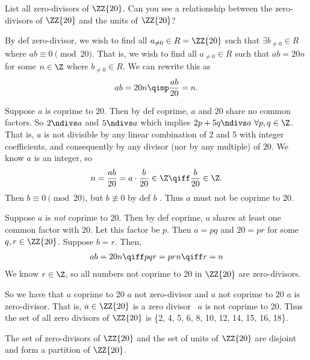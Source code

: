 \documentclass{article}
\begin{document}
List all zero-divisors of \( \ZZ{20} \). Can you see a relationship between the zero-divisors of \( \ZZ{20} \) and the units of \( \ZZ{20} \)?

\begin{solution} %
  By def zero-divisor, we wish to find all \( a_{\neq 0}\in R = \ZZ{20} \) such that \( \exists b_{\neq 0} \in R \) where \( ab\equiv 0 \pmod{20} \).
  That is, we wish to find all \( a_{\neq 0} \in R \) such that \( ab = 20n \) for some \( n\in\Z \) where \( b_{\neq 0}\in R \).
  We can rewrite this as
  \begin{align*}
    ab = 20n \qimp \frac{ab}{20} = n.
  \end{align*}

  Suppose \( a \) is coprime to \( 20 \). Then by def coprime, \( a \) and \( 20 \) share no common factors.
  So \( 2\ndivs a \) and \( 5\ndivs a \) which implies \( 2p+5q\ndivs a\ \forall p,q\in\Z \).
  That is, \( a \) is not divisible by any linear combination of 2 and 5 with integer coefficients, and consequently by any divisor (nor by any multiple) of \( 20 \). We know \( a \) is an integer, so
  \begin{align*}
    n = \frac{ab}{20} = a \cdot \frac{b}{20}\in\Z \qiff \frac{b}{20}\in\Z.
  \end{align*}
  Then \( b \equiv 0\pmod{20} \), but \( b\not\equiv 0 \) by def \( b \) \contradiction. Thus \( a \) must not be coprime to \( 20 \).

  Suppose \( a \) is \emph{not} coprime to \( 20 \). Then by def coprime, \( a \) shares at least one common factor with \( 20 \). Let this factor be \( p \). Then \( a = pq \) and \( 20 = pr \) for some \(q,r \in\ZZ{20} \). Suppose \( b = r \). Then,
  \begin{align*}
    ab = 20n \qiff pqr = prn \qiff r = n
  \end{align*}
  We know \( r\in\Z \), so all numbers not coprime to 20 in \( \ZZ{20} \) are zero-divisors.

  So we have that \( a \) coprime to 20 \imp \( a \) not zero-divisor and \( a \) not coprime to 20 \imp \( a \) is zero-divisor. That is, \( a\in\ZZ{20} \) is a zero divisor \iff\ \( a \) is not coprime to \( 20 \). Thus the set of all zero divisors of \( \ZZ{20} \) is \{2, 4, 5, 6, 8, 10, 12, 14, 15, 16, 18\}.

  The set of zero-divisors of \( \ZZ{20} \) and the set of units of \( \ZZ{20} \) are disjoint and form a partition of \( \ZZ{20} \).
\end{solution}
\end{document}
